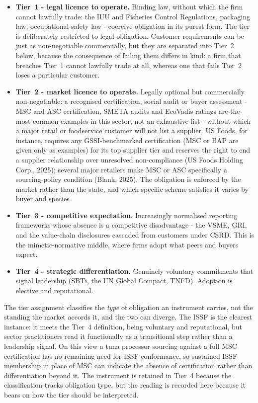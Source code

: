 \begin{itemize}
\item \textbf{Tier~1 - legal licence to operate.} Binding law, without which
the firm cannot lawfully trade: the IUU and Fisheries Control Regulations,
packaging law, occupational-safety law - coercive obligation in its purest form.
The tier is deliberately restricted to legal obligation. Customer requirements
can be just as non-negotiable commercially, but they are separated into Tier~2
below, because the consequence of failing them differs in kind: a firm that
breaches Tier~1 cannot lawfully trade at all, whereas one that fails Tier~2
loses a particular customer.

\item \textbf{Tier~2 - market licence to operate.} Legally optional but
commercially non-negotiable: a recognised certification, social audit or buyer
assessment - MSC and ASC certification, SMETA audits and EcoVadis ratings are the
most common examples in this sector,
not an exhaustive list - without which a major retail or foodservice
customer will not list a supplier. US Foods, for instance, requires any
GSSI-benchmarked certification (MSC or BAP are given only as examples) for
its top supplier tier and reserves the right to end a supplier relationship
over unresolved non-compliance (US Foods Holding Corp., 2025); several major
retailers make MSC or ASC specifically a sourcing-policy condition (Blank,
2025). The obligation is enforced by the market rather than the state, and
which specific scheme satisfies it varies by buyer and species.

\item \textbf{Tier~3 - competitive expectation.} Increasingly normalised
reporting frameworks whose absence is a competitive disadvantage - the VSME,
GRI, and the value-chain disclosures cascaded from customers under CSRD. This is
the mimetic-normative middle, where firms adopt what peers and buyers expect.

\item \textbf{Tier~4 - strategic differentiation.} Genuinely voluntary
commitments that signal leadership (SBTi, the UN Global Compact, TNFD). Adoption
is elective and reputational.
\end{itemize}

The tier assignment classifies the \emph{type} of obligation an instrument
carries, not the standing the market accords it, and the two can diverge. The
ISSF is the clearest instance: it meets the Tier~4 definition, being voluntary
and reputational, but sector practitioners read it functionally as a
transitional step rather than a leadership signal. On this view a tuna processor
sourcing against a full MSC certification has no remaining need for ISSF
conformance, so sustained ISSF membership in place of MSC can indicate the
absence of certification rather than differentiation beyond it. The instrument is
retained in Tier~4 because the classification tracks obligation type, but the
reading is recorded here because it bears on how the tier should be interpreted.

